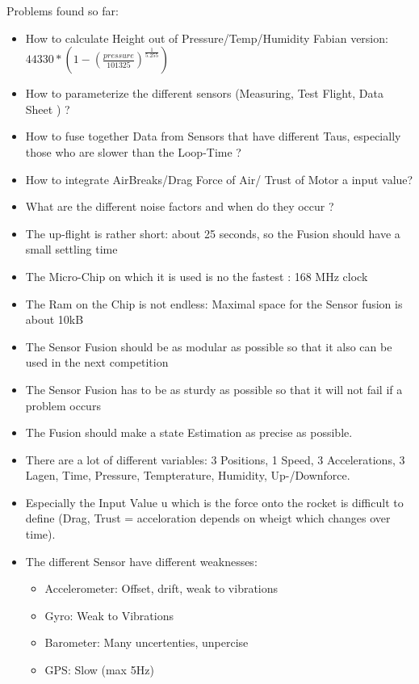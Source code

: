  Problems found so far:
 \begin{itemize}
  \item How to calculate Height out of Pressure/Temp/Humidity Fabian version: $44330 * (1 - (\frac{pressure}{101325})^{ \frac{1}{5.255}})$
  \item How to parameterize the different sensors (Measuring, Test Flight, Data Sheet ) ? 
  \item How to fuse together Data from Sensors that have different Taus, especially those who are slower than the Loop-Time ?
  \item How to integrate AirBreaks/Drag Force of Air/ Trust of Motor a input value?
  \item What are the different noise factors and when do they occur ?
  \item The up-flight is rather short: about 25 seconds, so the Fusion should have a small settling time
  \item The Micro-Chip on which it is used is no the fastest : 168 MHz clock
  \item The Ram on the Chip is not endless: Maximal space for the Sensor fusion is about 10kB
  \item The Sensor Fusion should be as modular as possible so that it also can be used in the next competition
  \item The Sensor Fusion has to be as sturdy as possible so that it will not fail if a problem occurs
  \item The Fusion should make a state Estimation as precise as possible.
  \item There are a lot of different variables: 3 Positions, 1 Speed, 3 Accelerations, 3 Lagen, Time, Pressure, Tempterature, Humidity, Up-/Downforce.
  \item Especially the Input Value u which is the force onto the rocket is difficult to define (Drag, Trust = acceloration depends on wheigt which changes over time).
  \item The different Sensor have different weaknesses: \begin{itemize}
							 \item Accelerometer: Offset, drift, weak to vibrations
                                                         \item Gyro: Weak to Vibrations
                                                         \item Barometer: Many uncertenties, unpercise
                                                         \item GPS: Slow (max 5Hz)
                                                        \end{itemize}
                                                        
								  
 \end{itemize}

